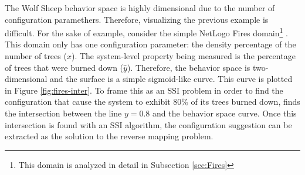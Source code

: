 The Wolf Sheep behavior space is highly dimensional due to the number of configuration paramethers.
Therefore, visualizing the previous example is difficult.
For the sake of example, consider the simple NetLogo Fires domain\footnote{This domain is analyzed in detail in Subsection \ref{sec:Fires}} \cite{fires}.
This domain only has one configuration parameter: the density percentage of the number of trees ($x$).
The system-level property being measured is the percentage of trees that were burned down ($\hat y$).
Therefore, the behavior space is two-dimensional and the surface is a simple sigmoid-like curve.
This curve is plotted in Figure \ref{fig:fires-inter}.
To frame this as an SSI problem in order to find the configuration that cause the system to exhibit 80\% of its trees burned down, \fw finds the intersection between the line $y = 0.8$ and the behavior space curve.
Once this intersection is found with an SSI algorithm, the configuration suggestion can be extracted as the solution to the reverse mapping problem.
